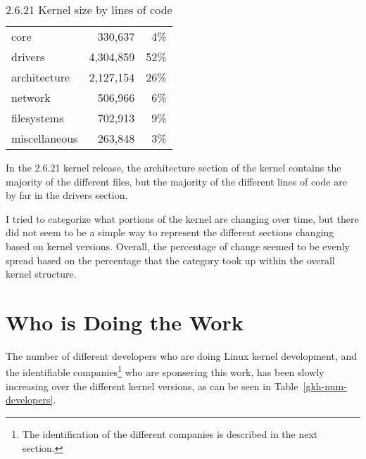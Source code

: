 \documentclass[final]{ols}
\begin{document}
\begin{table}[tbph]
\begin{center}
\begin{tabular}{|l|r|r|}
\hline
\raisebox{-1.5ex}{Category} & 
\multicolumn{1}{|p{2.0cm}|}{\centering{Lines of Code}} &
\multicolumn{1}{|p{1.2cm}|}{\centering{\% of kernel}} \\
\hline
\hline
\rule[-0.1ex]{0pt}{2.5ex}core		&   330,637 &  4\%	\\
drivers		& 4,304,859 & 52\%	\\
architecture	& 2,127,154 & 26\%	\\
network		&   506,966 &  6\%	\\
filesystems	&   702,913 &  9\%	\\
miscellaneous	&   263,848 &  3\%	\\
\hline
\end{tabular}
\caption{2.6.21 Kernel size by lines of code}
\label{gkh-size-by-lines}
\end{center}
\end{table}

In the 2.6.21 kernel release, the architecture section of the kernel
contains the majority of the different files, but the majority of the
different lines of code are by far in the drivers section.

I tried to categorize what portions of the kernel are changing over
time, but there did not seem to be a simple way to represent the
different sections changing based on kernel versions.  Overall, the
percentage of change seemed to be evenly spread based on the percentage
that the category took up within the overall kernel structure.

\section{Who is Doing the Work}

The number of different developers who are doing Linux kernel
development, and the identifiable companies\footnote{The identification
of the different companies is described in the next section.} who are
sponsering this work, has been slowly increasing over the different
kernel versions, as can be seen in Table~\ref{gkh-num-developers}.
\end{document}
